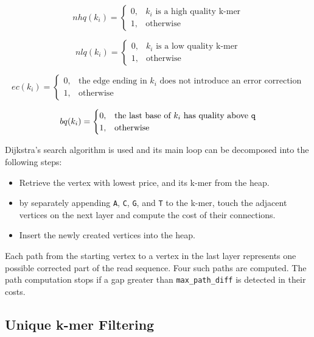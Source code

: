 \begin{equation*}
nhq(k_i) = 
	\begin{cases}
		0, & \text{$k_i$ is a high quality k-mer} \\
		1, & \text{otherwise}
	\end{cases}
\end{equation*}
	
\begin{equation*}
nlq(k_i) = 
	\begin{cases}
		0, & \text{$k_i$ is a low quality k-mer} \\
		1, & \text{otherwise}
	\end{cases}
\end{equation*}

\begin{equation*}
ec(k_i) = 
	\begin{cases}
		0, & \text{the edge ending in $k_i$ does not introduce an error correction} \\
		1, & \text{otherwise}
	\end{cases}
\end{equation*}

\begin{equation*}
bq(k_i) = 
	\begin{cases}
		0, & \text{the last base of $k_i$ has quality above \texttt{q}} \\
		1, & \text{otherwise}
	\end{cases}
\end{equation*}

Dijkstra's search algorithm is used and its main loop can be decomposed into the following steps:
\begin{itemize}
\item Retrieve the vertex with lowest price, and its k-mer from the heap.
\item by separately appending \texttt{A}, \texttt{C}, \texttt{G}, and \texttt{T} to the k-mer, touch the adjacent vertices on the next layer and compute the cost of their connections.
\item Insert the newly created vertices into the heap.
\end{itemize}

Each path from the starting vertex to a vertex in the last layer represents one possible corrected part of the read sequence. Four such paths are computed. The path computation stops if a gap greater than \texttt{max\_path\_diff} is detected in their costs.

\subsection{Unique k-mer Filtering}
\label{subsec:fermi-unique-kmer-filtering}

